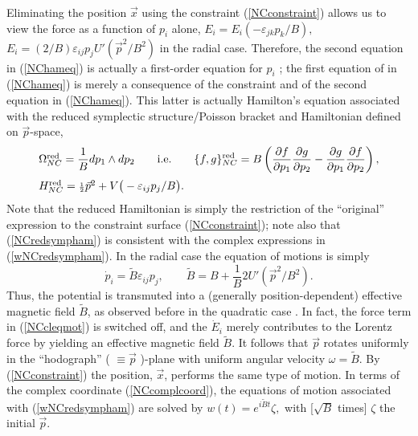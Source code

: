 \documentclass[a4paper,11pt]{article}
\newcommand{\half}{{\scriptstyle{\frac{1}{2}}}}
\newcommand{\vx}{{\vec x}}
\newcommand{\red}{{\rm red}}
\def\p{{\partial}}
\def\vp{{\vec p}}
\def\vx{{\vec x}}
\begin{document}
Eliminating the position
$\vx$  using the constraint (\ref{NCconstraint}) allows us to
view the force as a function of $p_{i}$ alone,
$
E_{i}=E_{i}(-\varepsilon_{jk}p_{k}/B),
$
$E_{i}=({2}/{B})\varepsilon_{ij}p_{j}U'(\vp^2/B^2)$ in the
radial case. Therefore, the second equation
in (\ref{NChameq}) is actually a
first-order equation for $p_{i}$ ;
the first equation of in (\ref{NChameq})
is merely a consequence of the constraint
and of the second equation in (\ref{NChameq}).
This latter is actually Hamilton's equation associated with the
reduced symplectic structure/Poisson bracket and Hamiltonian
defined on $\vp$-space,
\begin{equation}
     \begin{array}{ll}
     \Omega_{NC}^{\red}=
     \displaystyle\frac{1}{B}dp_{1}\wedge dp_{2}
     \qquad\hbox{i.e.}\qquad
     \{f,g\}_{NC}^{\red}=B\left(\displaystyle\frac{\p f}{\p p_{1}}
     \displaystyle\frac{\p g}{\p p_{2}}
     -
     \displaystyle\frac{\p g}{\p p_{1}}\displaystyle
     \frac{\p f}{\p p_{2}}
     \right),\hfill
     \\[12pt]
     H_{NC}^{\red}=\half\vp^2+V\big(-\varepsilon_{ij}p_{j}/B\big).\hfill
\end{array}
\label{NCredsympham}
\end{equation}
Note  that the reduced Hamiltonian is simply the restriction of the
``original'' expression to the constraint surface (\ref{NCconstraint});
note also that (\ref{NCredsympham}) is consistent with the complex
expressions in (\ref{wNCredsympham}).
In the radial case the equation of motions is simply
\begin{equation}
     \dot{p}_{i}=\widetilde{B}\varepsilon_{ij}p_{j},
     \qquad
     \widetilde{B}=
     B+\frac{1}{B}2U'(\vp^2/B^2).
     \label{redpeq}
\end{equation}
Thus, the potential is transmuted into a (generally position-dependent)
effective magnetic field $\widetilde{B}$, as
observed before in the quadratic case \cite{NaPo}.
In fact, the force term in (\ref{NCcleqmot}) is switched off,
and the $\dot{E}_{i}$ merely contributes to the Lorentz force by
yielding an effective magnetic field $\widetilde{B}$.
It follows that $\vp$ rotates uniformly in the
``hodograph'' ( $\equiv \vp$ )-plane with uniform angular velocity
$\omega=\widetilde{B}$.
By (\ref{NCconstraint}) the position, $\vx$, performs the same type of
motion. In terms of the complex coordinate
(\ref{NCcomplcoord}),
the equations of motion associated with (\ref{wNCredsympham})
are solved by
$
w(t)=e^{i\widetilde{B}t}\zeta,
$
with [$\sqrt{B}$ times] $\zeta$ the initial $\vp$.
\end{document}
